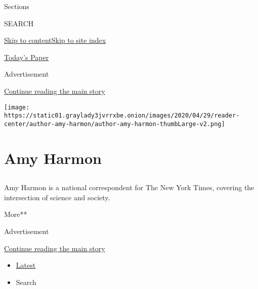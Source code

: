 Sections

SEARCH

\protect\hyperlink{site-content}{Skip to
content}\protect\hyperlink{site-index}{Skip to site index}

\href{https://myaccount.nytimes3xbfgragh.onion/auth/login?response_type=cookie\&client_id=vi}{}

\href{https://www.nytimes3xbfgragh.onion/section/todayspaper}{Today's
Paper}

Advertisement

\protect\hyperlink{after-top}{Continue reading the main story}

\texttt{[image: https://static01.graylady3jvrrxbe.onion/images/2020/04/29/reader-center/author-amy-harmon/author-amy-harmon-thumbLarge-v2.png]}

\hypertarget{amy-harmon}{%
\section{Amy Harmon}\label{amy-harmon}}

\hypertarget{section}{%
\subsection{}\label{section}}

Amy Harmon is a national correspondent for The New York Times, covering
the intersection of science and society.

More**

Advertisement

\protect\hyperlink{after-mid1}{Continue reading the main story}

\begin{itemize}
\tightlist
\item
  \protect\hyperlink{stream-panel}{Latest}
\item
  Search
\end{itemize}

